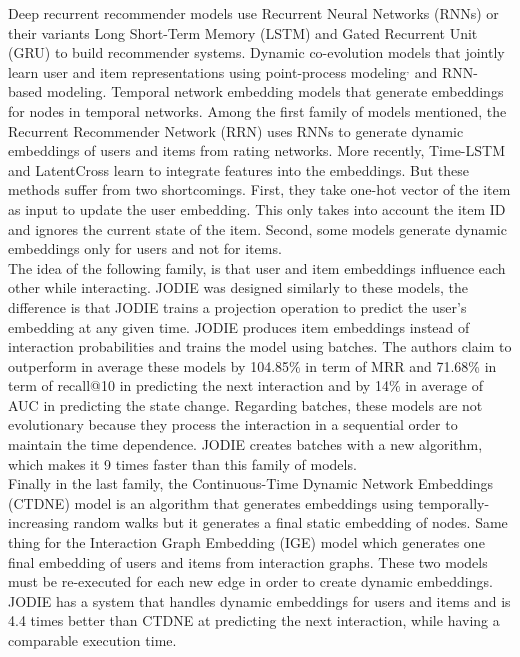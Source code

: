 {%
    Deep recurrent recommender models use Recurrent Neural Networks\supercite{Rumelhart1986} (RNNs) or their variants Long Short-Term Memory\supercite{LSTM} (LSTM) and Gated Recurrent Unit\supercite{https://doi.org/10.48550/arxiv.1406.1078GRU} (GRU) to build recommender systems.
   Dynamic co-evolution models that jointly learn user and item representations using point-process modeling\supercite{https://doi.org/10.48550/arxiv.1705.05742}$^,$\supercite{NIPS2016_53ed35c7} and RNN-based modeling\supercite{https://doi.org/10.48550/arxiv.1609.03675}.
    Temporal network embedding models that generate embeddings for nodes in temporal networks.
Among the first family of models mentioned, the Recurrent Recommender Network\supercite{10.1145/3018661.3018689} (RRN) uses RNNs to generate dynamic embeddings of users and items from rating networks. More recently, Time-LSTM\supercite{ijcai2017-504} and LatentCross\supercite{46488} learn to integrate features into the embeddings. But these methods suffer from two shortcomings. First, they take one-hot vector of the item as input to update the user embedding. This only takes into account the item ID and ignores the current state of the item. Second, some models generate dynamic embeddings only for users and not for items.\\

The idea of the following family, is that user and item embeddings influence each other while interacting. JODIE was designed similarly to these models, the difference is that JODIE trains a projection operation to predict the user's embedding at any given time. JODIE produces item embeddings instead of interaction probabilities and trains the model using batches. The authors claim to outperform in average these models by 104.85\% in term of MRR and 71.68\% in term of recall@10 in predicting the next interaction and by 14\% in average of AUC in predicting the state change. Regarding batches, these models are not evolutionary because they process the interaction in a sequential order to maintain the time dependence. JODIE creates batches with a new algorithm, which makes it 9 times faster than this family of models.\\

Finally in the last family, the Continuous-Time Dynamic Network Embeddings\supercite{CTDNE} (CTDNE) model is an algorithm that generates embeddings using temporally-increasing random walks but it generates a final static embedding of nodes. Same thing for the Interaction Graph Embedding\supercite{IGE} (IGE) model which generates one final embedding of users and items from interaction graphs. These two models must be re-executed for each new edge in order to create dynamic embeddings. JODIE has a system that handles dynamic embeddings for users and items and is 4.4 times better than CTDNE at predicting the next interaction, while having a comparable execution time. \\

}
